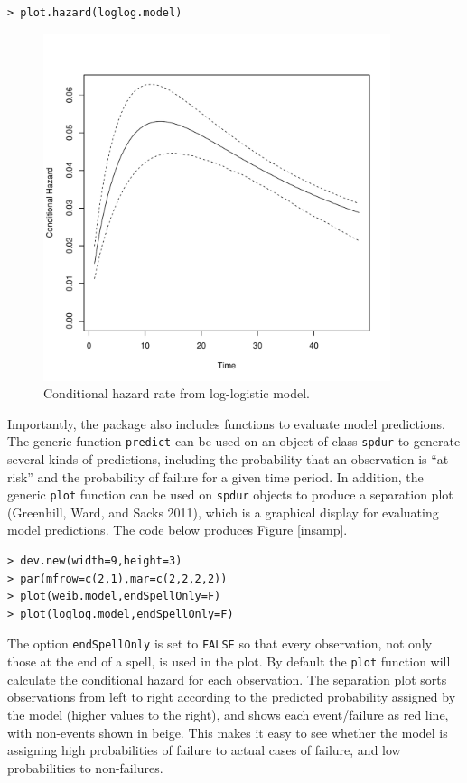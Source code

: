 \documentclass[]{article}
\begin{document}
\begin{verbatim}
> plot.hazard(loglog.model)
\end{verbatim}

\begin{figure}[htbp!]
\centering
\includegraphics[width=4in]{loglog_hazard.pdf}
\caption{Conditional hazard rate from log-logistic model.} \label{hazard}
\end{figure}

Importantly, the package also includes functions to evaluate model
predictions. The generic function \texttt{predict} can be used on an
object of class \texttt{spdur} to generate several kinds of predictions,
including the probability that an observation is ``at-risk'' and the
probability of failure for a given time period. In addition, the generic
\texttt{plot} function can be used on \texttt{spdur} objects to produce
a separation plot (Greenhill, Ward, and Sacks 2011), which is a
graphical display for evaluating model predictions. The code below
produces Figure \ref{insamp}. \small

\begin{verbatim}
> dev.new(width=9,height=3)
> par(mfrow=c(2,1),mar=c(2,2,2,2))
> plot(weib.model,endSpellOnly=F)
> plot(loglog.model,endSpellOnly=F)
\end{verbatim}

\normalsize
The option \texttt{endSpellOnly} is set to \texttt{FALSE} so that every
observation, not only those at the end of a spell, is used in the plot.
By default the \texttt{plot} function will calculate the conditional
hazard for each observation. The separation plot sorts observations from
left to right according to the predicted probability assigned by the
model (higher values to the right), and shows each event/failure as red
line, with non-events shown in beige. This makes it easy to see whether
the model is assigning high probabilities of failure to actual cases of
failure, and low probabilities to non-failures.
\end{document}
